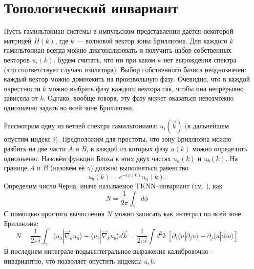 \section{Топологический инвариант}
Пусть гамильтониан системы в импульсном представлении даётся некоторой
матрицей $H(k)$, где $k$ --- волновой вектор зоны Бриллюэна.  
Для каждого $k$ гамильтониан всегда можно диагонализовать
и получить набор собственных векторов $u_i(k)$. Будем считать, что ни при каком $k$ нет 
вырождения спектра (это соответствует случаю изолятора). 
Выбор собственного базиса неоднозначен: каждый вектор
можно домножить на произвольную фазу. Очевидно, что в каждой окрестности $k$ можно выбрать
фазу каждого вектора так, чтобы она непрерывно зависела от $k$. Однако, вообще говоря, 
эту фазу может оказаться невозможно однозначно задать во всей зоне Бриллюэна.

Рассмотрим одну из ветвей спектра гамильтониана: $u_i(\vec{k})$ 
(в дальнейшем опустим индекс $i$). Предположим для простоты, что зону Бриллюэна
можно разбить на две части $A$ и $B$, 
в каждой из которых фазу $u(k)$  можно определить однозначно. 
Назовём функции Блоха в этих двух частях $u_a(k)$ и $u_b(k)$. На границе $A$ и $B$ (назовём
её $\gamma$) должно выполняться равенство
\begin{equation}
   u_b(k) = e^{-i\phi(k)}u_a(k).
\end{equation}
Определим число Черна, иначе называемое $\mathrm{TKNN}$--инвариант 
(см. \cite{Kohmoto1985, Thouless1982}), как
\begin{equation}
    N = \frac{1}{2\pi}\int_\gamma d\phi
\end{equation}
С помощью простого вычисления %
$N$ можно записать как интеграл по всей зоне Бриллюэна:
\begin{equation}
    N = \frac{1}{2\pi i}\int_\gamma \langle u_a |\vec{\nabla}_k u_a \rangle  - 
                             \langle u_b |\vec{\nabla}_k u_b \rangle d\vec{k} = 
        \frac{1}{2\pi i} 
            \int d^2 k\, \left[\partial_i \langle u | \partial_j u \rangle -
            \partial_j \langle u | \partial_i u \rangle \right]
\end{equation}
В последнем интеграле подыынтегральное выражение калибровочно--инвариантно, что
позволяет опустить индексы $a,b$. 

